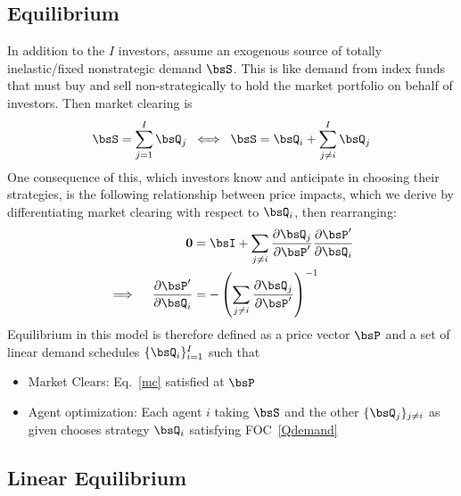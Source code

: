 \documentclass[12pt]{article}
\theoremstyle{plain}
\theoremstyle{definition}
\theoremstyle{remark}
\renewcommand{\bso}{\boldsymbol{0}}
\begin{document}
\begin{multicols*}{2}
\subsection{Equilibrium}

In addition to the $I$ investors, assume an exogenous source of totally
inelastic/fixed nonstrategic demand $\bsS$.
This is like demand from index funds that must buy and sell
non-strategically to hold the market portfolio on behalf of investors.
Then market clearing is
\begin{align}
  \bsS
  = \sum_{j=1}^I \bsQ_j
  \;\iff\;
  \bsS
  = \bsQ_i + \sum_{j\neq i}^I \bsQ_j
  \label{mc}
\end{align}
One consequence of this, which investors know and anticipate in choosing
their strategies, is the following relationship between price impacts,
which we derive by differentiating market clearing with respect to
$\bsQ_i$, then rearranging:
\begin{align}
  \bso
  &=
  \bsI
  +
  \sum_{j\neq i}
  \frac{\partial \bsQ_j}{\partial \bsP'}
  \frac{\partial \bsP'}{\partial \bsQ_i}
  \notag
  \\
  \implies\quad
  \frac{\partial \bsP'}{\partial \bsQ_i}
  &=
  -
  \left(
  \sum_{j\neq i}
  \frac{\partial \bsQ_j}{\partial \bsP'}
  \right)^{-1}
  \label{priceimpact}
\end{align}
Equilibrium in this model is therefore defined as
a price vector $\bsP$ and a set of linear demand schedules
$\{\bsQ_i\}_{i=1}^I$ such that
\begin{itemize}
  \item Market Clears: Eq.~\ref{mc} satisfied at $\bsP$
  \item Agent optimization:
    Each agent $i$ taking $\bsS$ and the other $\{\bsQ_j\}_{j\neq i}$ as
    given chooses strategy $\bsQ_i$ satisfying FOC~\ref{Qdemand}
\end{itemize}


\subsection{Linear Equilibrium}


\end{multicols*}
\end{document}
